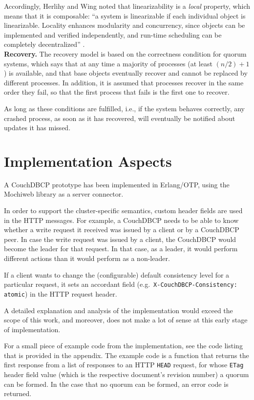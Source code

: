 Accordingly, Herlihy and Wing noted that linearizability is a \emph{local} property, which means that it is composable: ``a system is linearizable if each individual object is linearizable. Locality enhances modularity and concurrency, since objects can be implemented and verified independently, and run-time scheduling can be completely decentralized'' \cite{HW87}.\\

\noindent
{\bf Recovery.}
The recovery model is based on the correctness condition for quorum systems, which says that at any time a majority of processes (at least $(n / 2) + 1$) is available, and that base objects eventually recover and cannot be replaced by different processes. In addition, it is assumed that processes recover in the same order they fail, so that the first process that fails is the first one to recover.

As long as these conditions are fulfilled, i.e., if the system behaves correctly, any crashed process, as soon as it has recovered, will eventually be notified about updates it has missed.


\section{Implementation Aspects}

A CouchDBCP prototype has been implemented in Erlang/OTP, using the Mochiweb library as a server connector.

In order to support the cluster-specific semantics, custom header fields are used in the HTTP messages. For example, a CouchDBCP needs to be able to know whether a write request it received was issued by a client or by a CouchDBCP peer. In case the write request was issued by a client, the CouchDBCP would become the leader for that request. In that case, as a leader, it would perform different actions than it would perform as a non-leader.

If a client wants to change the (configurable) default consistency level for a particular request, it sets an accordant field (e.g.\ {\tt X-CouchDBCP-Consistency: atomic}) in the HTTP request header.

A detailed explanation and analysis of the implementation would exceed the scope of this work, and moreover, does not make a lot of sense at this early stage of implementation.

For a small piece of example code from the implementation, see the code listing that is provided in the appendix. The example code is a function that returns the first response from a list of responses to an HTTP {\tt HEAD} request, for whose {\tt ETag} header field value (which is the respective document's revision number) a quorum can be formed. In the case that no quorum can be formed, an error code is returned.


